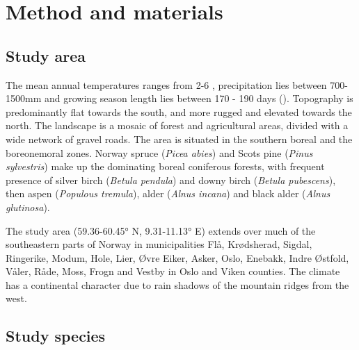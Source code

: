 \chapter{Method and materials}


\section{Study area} %


The mean annual temperatures ranges from 2-6 \celsius , precipitation lies between 700-1500mm and growing season length lies between 170 - 190 days (\cite{Moen1999}).
Topography is predominantly flat towards the south, and more rugged and elevated towards the north. The landscape is a mosaic of forest and agricultural areas, divided with a wide network of gravel roads.
The area is situated in the southern boreal and the boreonemoral zones. %
Norway spruce (\textit{Picea abies}) and Scots pine (\textit{Pinus sylvestris}) make up the dominating boreal coniferous forests, with frequent presence of silver birch (\textit{Betula pendula}) and downy birch (\textit{Betula pubescens}), then aspen (\textit{Populous tremula}), alder (\textit{Alnus incana}) and black alder (\textit{Alnus glutinosa}).


The study area (59.36-60.45° N, 9.31-11.13° E) extends over much of the southeastern parts of Norway in municipalities Flå, Krødsherad, Sigdal, Ringerike, Modum, Hole, Lier, Øvre Eiker, Asker, Oslo, Enebakk, Indre Østfold, Våler, Råde, Moss, Frogn and Vestby in Oslo and Viken counties. 
The climate has a continental character due to rain shadows of the mountain ridges from the west. 


\section{Study species} %

